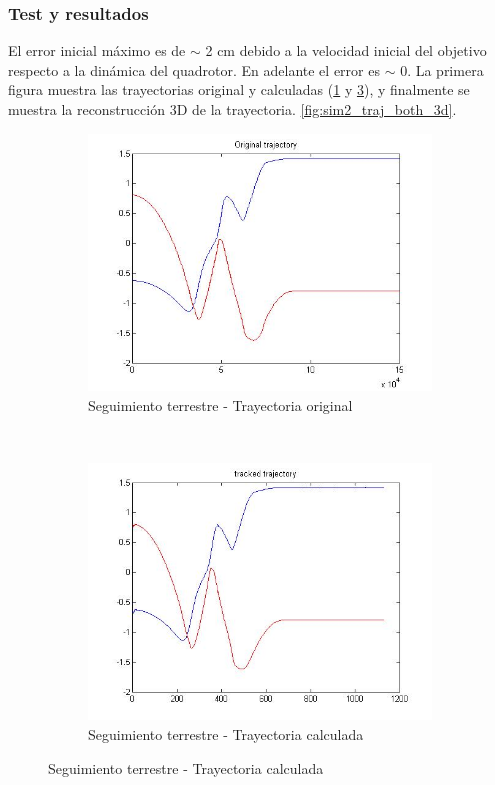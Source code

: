 \subsubsection{Test y resultados}
\label{lab:sim2_test_results}
El error inicial m\'aximo es de $\sim$ 2 cm debido a la velocidad inicial del objetivo respecto a la din\'amica del quadrotor. En adelante el error es $\sim$ 0. La primera figura muestra las trayectorias original y calculadas (\ref{fig:sim2_traj_ori} y \ref{fig:sim2_traj_track}), y finalmente se muestra la reconstrucci\'on 3D de la trayectoria. \ref{fig:sim2_traj_both_3d}.

\begin{figure}[htp]
	\centering
	\begin{subfigure}[htp]{0.48\linewidth}
		\centering
		\includegraphics[width=\linewidth]{../Images/c3/sim2_traj_ori}
		\caption{Seguimiento terrestre - Trayectoria original}
		\label{fig:sim2_traj_ori}
	\end{subfigure}
	~
	\begin{subfigure}[htp]{0.48\linewidth}
		\centering
		\includegraphics[width=\linewidth]{../Images/c3/sim2_traj_track}
		\caption{Seguimiento terrestre - Trayectoria calculada}
		\label{fig:sim2_traj_track}
	\end{subfigure}

\end{figure}


